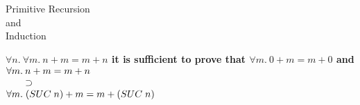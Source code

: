 


\renewcommand{\textfraction}{0.01}	  %
\setcounter{totalnumber}{10}	 	  %
\flushbottom				  %
\pagestyle{slides}			  %
\setlength{\unitlength}{1mm}		  %


\def\_{\char'137}






\bsectitle
Primitive Recursion\\
and\\
Induction
\esectitle



\vskip 5mm
\bspindent\LARGE\bf
$\forall n.\: \forall m.\: n + m = m + n$
\espindent
\vskip5mm
\bpindent\LARGE\bf
it is sufficient to prove that
\epindent
\vskip5mm
\bspindent\LARGE\bf
$\forall m.\: 0 + m = m + 0$
\vskip5mm
\bpindent\LARGE\bf
and
\epindent
\vskip5mm
$\begin{array}[t]{@{}l}
\forall m.\: n + m = m+n \;\\
\;\;\;\;\;\;\;\supset\\
 \forall m.\; (SUC\; n) + m = m + (SUC\; n)\end{array}$
\espindent

